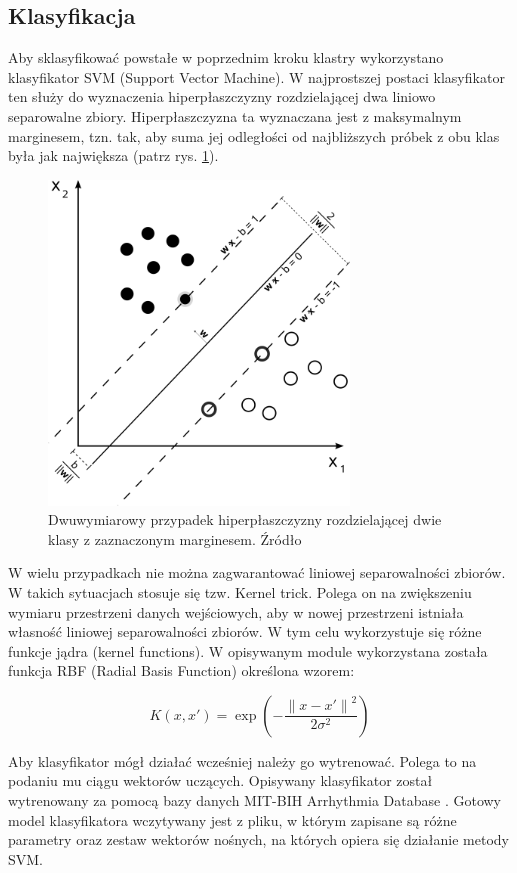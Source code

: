 \subsection{Klasyfikacja}

\qquad Aby sklasyfikować powstałe w poprzednim kroku klastry wykorzystano klasyfikator SVM (Support Vector Machine). W najprostszej postaci klasyfikator ten służy do wyznaczenia hiperpłaszczyzny rozdzielającej dwa liniowo separowalne zbiory. Hiperpłaszczyzna ta wyznaczana jest z maksymalnym marginesem, tzn. tak, aby suma jej odległości od najbliższych próbek z obu klas była jak największa (patrz rys. \ref{fig:SVM}).

\begin{figure}[h]
	\centering
	\includegraphics[width=8cm]{Grafika/Svm_max_sep_hyperplane_with_margin}
	\caption{Dwuwymiarowy przypadek hiperpłaszczyzny rozdzielającej dwie klasy z zaznaczonym marginesem. Źródło \cite{SVMWiki}}
	\label{fig:SVM}
\end{figure}

\qquad W wielu przypadkach nie można zagwarantować liniowej separowalności zbiorów.  W takich sytuacjach stosuje się tzw. Kernel trick. Polega on na zwiększeniu wymiaru przestrzeni danych wejściowych, aby w nowej przestrzeni istniała własność liniowej separowalności zbiorów. W tym celu wykorzystuje się różne funkcje jądra (kernel functions). W opisywanym module wykorzystana została funkcja RBF (Radial Basis Function) określona wzorem:

\begin{equation}
\label{eq:RBF}
K(x,x') = \exp{\left(-\frac{{\|x-x'\|}^{2}}{2\sigma^2}\right)}
\end{equation}

\qquad Aby klasyfikator mógł działać wcześniej należy go wytrenować. Polega to na podaniu mu ciągu wektorów uczących. Opisywany klasyfikator został wytrenowany za pomocą bazy danych MIT-BIH Arrhythmia Database \cite{MITDB}. Gotowy model klasyfikatora wczytywany jest z pliku, w którym zapisane są różne parametry oraz zestaw wektorów nośnych, na których opiera się działanie metody SVM.
